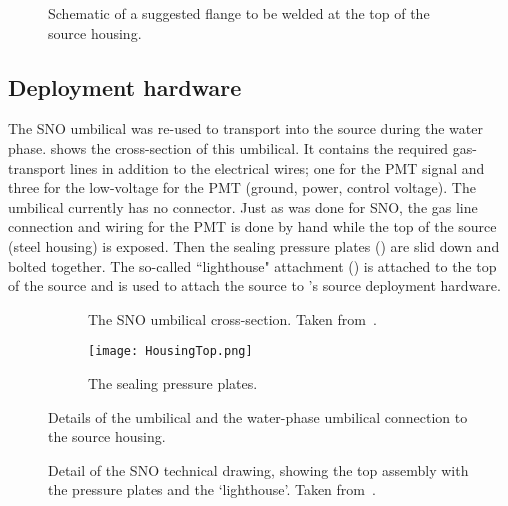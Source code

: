 \begin{figure}
\caption{\label{fig:flange} Schematic of a suggested flange to be welded at the top of the source housing. }
\end{figure}

\subsection{Deployment hardware}

The SNO \Li umbilical was re-used to transport \Li into the source during the {\snop} water phase.
 shows the cross-section of this umbilical. It contains the required gas-transport lines in addition to the electrical wires; one for the PMT signal and three for the low-voltage for the PMT (ground, power, control voltage). 
The umbilical currently has no connector. 
Just as was done for SNO, the gas line connection and wiring for the PMT is done by hand while the top of the source (steel housing) is exposed. 
Then the sealing pressure plates () are slid down and bolted together. 
The so-called ``lighthouse" attachment () is attached to the top of the source and is used to attach the source to {\snop}'s source deployment hardware.

\begin{figure}
\begin{subfigure}{.57\textwidth}
\caption{\label{fig:sno_umbilical} The SNO \Li umbilical cross-section. Taken from~\cite{Tagg:2001}.}
\end{subfigure}
\hspace{0.5cm}
\begin{subfigure}{.35\textwidth}
\texttt{[image: HousingTop.png]}
\caption{\label{fig:pressureplates} The sealing pressure plates.}
\end{subfigure}
\caption{Details of the umbilical and the water-phase umbilical connection to the source housing.}
\end{figure}

\begin{figure}
\caption{\label{fig:connection}Detail of the SNO \Li technical drawing, showing the top assembly with the pressure plates and the `lighthouse'. Taken from~\cite{Tagg:2001}.}
\end{figure}

